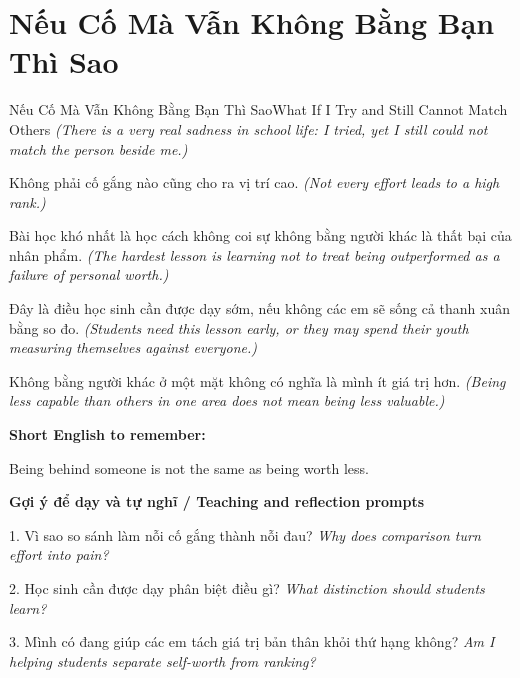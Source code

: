 \section{Nếu Cố Mà Vẫn Không Bằng Bạn Thì Sao}
\begin{truyen}{Nếu Cố Mà Vẫn Không Bằng Bạn Thì Sao}{What If I Try and Still Cannot Match Others}
\textit{(There is a very real sadness in school life: I tried, yet I still could not match the person beside me.)}

Không phải cố gắng nào cũng cho ra vị trí cao.
\textit{(Not every effort leads to a high rank.)}

Bài học khó nhất là học cách không coi sự không bằng người khác là thất bại của nhân phẩm.
\textit{(The hardest lesson is learning not to treat being outperformed as a failure of personal worth.)}

Đây là điều học sinh cần được dạy sớm, nếu không các em sẽ sống cả thanh xuân bằng so đo.
\textit{(Students need this lesson early, or they may spend their youth measuring themselves against everyone.)}

\end{truyen}

\begin{baihoc}
Không bằng người khác ở một mặt không có nghĩa là mình ít giá trị hơn.
\textit{(Being less capable than others in one area does not mean being less valuable.)}
\end{baihoc}

\begin{ghinhoanh}
\textbf{Short English to remember:}

Being behind someone is not the same as being worth less.

\end{ghinhoanh}

\begin{tuhocnhanh}
\textbf{Gợi ý để dạy và tự nghĩ / Teaching and reflection prompts}

1. Vì sao so sánh làm nỗi cố gắng thành nỗi đau? \textit{Why does comparison turn effort into pain?}

2. Học sinh cần được dạy phân biệt điều gì? \textit{What distinction should students learn?}

3. Mình có đang giúp các em tách giá trị bản thân khỏi thứ hạng không? \textit{Am I helping students separate self-worth from ranking?}
\end{tuhocnhanh}
\ngancach

